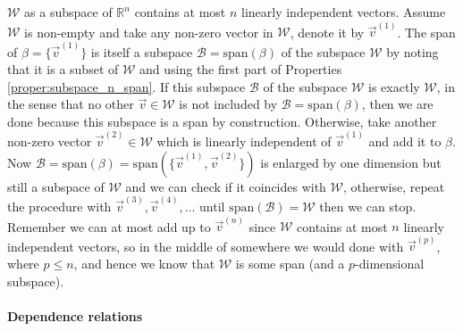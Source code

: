 $\mathcal{W}$ as a subspace of $\mathbb{R}^n$ contains at most $n$ linearly independent vectors. Assume $\mathcal{W}$ is non-empty and take any non-zero vector in $\mathcal{W}$, denote it by $\vec{v}^{(1)}$. The span of $\mathcal{\beta} = \{\vec{v}^{(1)}\}$ is itself a subspace $\mathcal{B} = \text{span}(\mathcal{\beta})$ of the subspace $\mathcal{W}$ by noting that it is a subset of $\mathcal{W}$ and using the first part of Properties \ref{proper:subspace_n_span}. If this subspace $\mathcal{B}$ of the subspace $\mathcal{W}$ is exactly $\mathcal{W}$, in the sense that no other $\vec{v} \in \mathcal{W}$ is not included by $\mathcal{B} = \text{span}(\mathcal{\beta})$, then we are done because this subspace is a span by construction. Otherwise, take another non-zero vector $\vec{v}^{(2)} \in \mathcal{W}$ which is linearly independent of $\vec{v}^{(1)}$ and add it to $\mathcal{\beta}$. Now $\mathcal{B} = \text{span}(\mathcal{\beta}) = \text{span}(\{\vec{v}^{(1)}, \vec{v}^{(2)}\})$ is enlarged by one dimension but still a subspace of $\mathcal{W}$ and we can check if it coincides with $\mathcal{W}$, otherwise, repeat the procedure with $\vec{v}^{(3)}, \vec{v}^{(4)}, \ldots$ until $\text{span}(\mathcal{B}) = \mathcal{W}$ then we can stop. Remember we can at most add up to $\vec{v}^{(n)}$ since $\mathcal{W}$ contains at most $n$ linearly independent vectors, so in the middle of somewhere we would done with $\vec{v}^{(p)}$, where $p \leq n$, and hence we know that $\mathcal{W}$ is some span (and a $p$-dimensional subspace).

\paragraph{Dependence relations}

